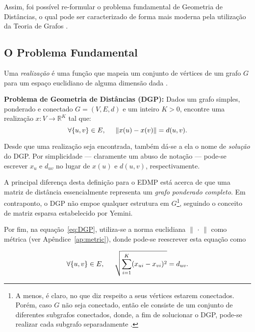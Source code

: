 Assim, foi possível re-formular o problema fundamental de Geometria de Distâncias, o qual pode ser caracterizado de forma mais moderna pela utilização da Teoria de Grafos \cite{carlileGDandAplications}.

\subsection{O Problema Fundamental}

Uma \textit{realização} é uma função que mapeia um conjunto de vértices de um grafo $G$ para um espaço euclidiano de alguma dimensão dada \cite{libertiEDG}.

\begin{center}
	\begin{minipage}{0.9 \linewidth}
		\textbf{Problema de Geometria de Distâncias (DGP):} Dados um grafo simples, ponderado e conectado $G = (V, E, d)$ e um inteiro $K>0$, encontre uma realização $x: V \longrightarrow \mathbb{R}^K$ tal que:
		\begin{equation}
		\forall \{u,v\} \in E, \hspace{0.5cm} \lVert x(u) - x(v) \rVert = d(u,v). \label{eq:DGP}
		\end{equation}
	\end{minipage}
\end{center}

Desde que uma realização seja encontrada, também dá-se a ela o nome de \textit{solução} do DGP. Por simplicidade --- claramente um abuso de notação --- pode-se escrever $x_u$ e $d_{uv}$ no lugar de $x(u)$ e $d(u,v)$, respectivamente.

A principal diferença desta definição para o EDMP está acerca de que uma matriz de distância essencialmente representa um \textit{grafo ponderado completo}. Em contraponto, o DGP não empoe qualquer estrutura em $G$\footnote{A menos, é claro, no que diz respeito a seus vértices estarem conectados. Porém, caso $G$ não seja conectado, então ele consiste de um conjunto de diferentes subgrafos conectados, donde, a fim de solucionar o DGP, pode-se realizar cada subgrafo separadamente \cite{libertiEDG}.}, seguindo o conceito de matriz esparsa estabelecido por Yemini.

Por fim, na equação~\ref{eq:DGP}, utiliza-se a norma euclidiana $\lVert$ $\cdot$ $\rVert$ como métrica (ver Apêndice~\ref{ap:metric}), donde pode-se reescrever esta equação como

\begin{equation*}
	\forall \{u,v\} \in E, \hspace{0.5cm} \sqrt{\sum_{i=1}^{K}(x_{ui} - x_{vi})^2} = d_{uv}.
\end{equation*}

